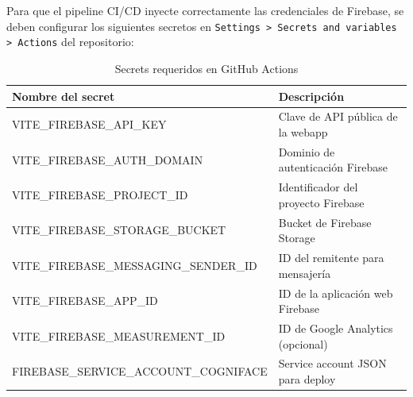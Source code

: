 \documentclass[12pt, a4paper]{report}
\begin{document}
Para que el pipeline CI/CD inyecte correctamente las credenciales de Firebase, se deben configurar los siguientes secretos en \texttt{Settings > Secrets and variables > Actions} del repositorio:

\begin{table}[H]
\centering
\caption{Secrets requeridos en GitHub Actions}
\label{tab:secrets}
\begin{tabular}{@{}>{\ttfamily\small}p{6cm} p{8cm}@{}}
\toprule
\rowcolor{royalblue!12}
\textbf{Nombre del secret} & \textbf{Descripción} \\
\midrule
VITE\_FIREBASE\_API\_KEY           & Clave de API pública de la webapp \\
VITE\_FIREBASE\_AUTH\_DOMAIN       & Dominio de autenticación Firebase \\
VITE\_FIREBASE\_PROJECT\_ID        & Identificador del proyecto Firebase \\
VITE\_FIREBASE\_STORAGE\_BUCKET    & Bucket de Firebase Storage \\
VITE\_FIREBASE\_MESSAGING\_SENDER\_ID & ID del remitente para mensajería \\
VITE\_FIREBASE\_APP\_ID            & ID de la aplicación web Firebase \\
VITE\_FIREBASE\_MEASUREMENT\_ID    & ID de Google Analytics (opcional) \\
FIREBASE\_SERVICE\_ACCOUNT\_COGNIFACE & Service account JSON para deploy \\
\bottomrule
\end{tabular}
\end{table}
\end{document}
